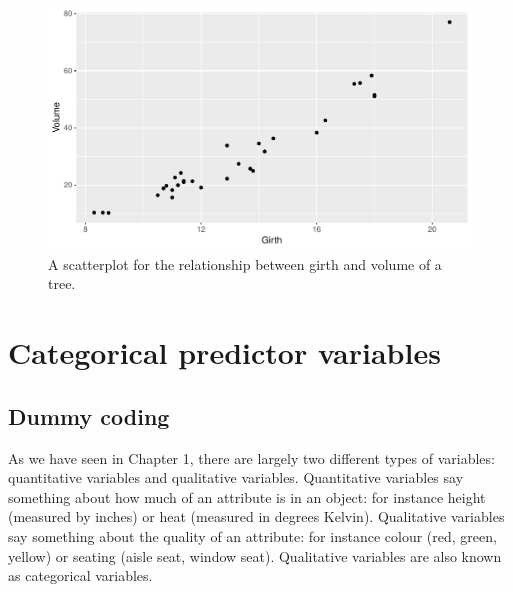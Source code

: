 \documentclass[]{report}\usepackage[]{graphicx}\usepackage[]{color}
\makeatletter
\def\maxwidth{ %
  \ifdim\Gin@nat@width>\linewidth
    \linewidth
  \else
    \Gin@nat@width
  \fi
}
\newenvironment{knitrout}{}{} %
\makeatother
\begin{document}
\begin{knitrout}
\color{fgcolor}\begin{figure}

{\centering \includegraphics[width=\maxwidth]{figure/multi_8-1} 

}

\caption[A scatterplot for the relationship between girth and volume of a tree]{A scatterplot for the relationship between girth and volume of a tree.}\label{fig:multi_8}
\end{figure}


\end{knitrout}





\chapter{Categorical predictor variables}\label{chap:categorical}



\section{Dummy coding}
As we have seen in Chapter 1, there are largely two different types of variables: quantitative variables and qualitative variables. Quantitative variables say something about how much of an attribute is in an object: for instance height (measured by inches) or heat (measured in degrees Kelvin). Qualitative variables say something about the quality of an attribute: for instance colour (red, green, yellow) or seating (aisle seat, window seat). Qualitative variables are also known as categorical variables.
\end{document}
